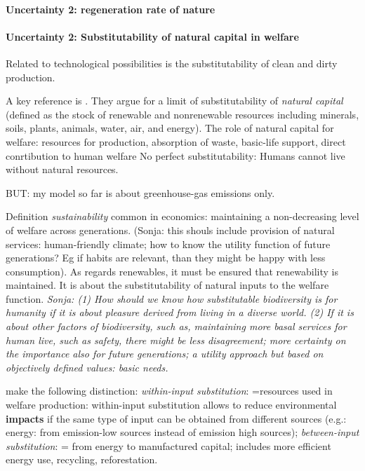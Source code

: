\paragraph{Uncertainty 2: regeneration rate of nature}

\paragraph{Uncertainty 2: Substitutability of natural capital in welfare}
Related to technological possibilities is the substitutability of clean and dirty production. 

A key reference is \cite{Cohen2019AnnualSubstitutable}. They argue for a limit of substitutability of \textit{natural capital} (defined as the stock of renewable and nonrenewable resources including minerals, soils, plants, animals, water, air, and energy). The role of natural capital for welfare: resources for production, absorption of waste, basic-life support, direct conrtibution to human welfare \ar No perfect substitutability: Humans cannot live without natural resources. 

BUT: my model so far is about greenhouse-gas emissions only.

Definition \textit{sustainability} common in economics: maintaining a non-decreasing level of welfare across generations. (Sonja: this shouls include provision of natural services: human-friendly climate; how to know the utility function of future generations? Eg if habits are relevant, than they might be happy with less consumption). As regards renewables, it must be ensured that renewability is maintained. It is about the substitutability of natural inputs to the welfare function. \textit{Sonja: (1) How should we know how substitutable biodiversity is for humanity if it is about pleasure derived from living in a diverse world. (2) If it is about other factors of biodiversity, such as, maintaining more basal services for human live, such as safety, there might be less disagreement; more certainty on the importance also for future generations; a utility approach but based on objectively defined values: basic needs.}

\cite{Cohen2019AnnualSubstitutable} make the following distinction: \textit{within-input substitution}: =resources used in welfare production: within-input substitution allows to reduce environmental \textbf{impacts} if the same type of input can be obtained from different sources (e.g.: energy: from emission-low sources instead of emission high sources); \textit{between-input substitution}: = from energy to manufactured capital; includes more efficient energy use, recycling, reforestation.

